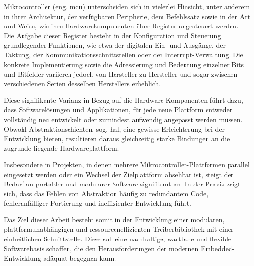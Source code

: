 Mikrocontroller (eng. \gls{mcu}) unterscheiden sich in vielerlei Hinsicht, unter anderem in ihrer Architektur, der verfügbaren Peripherie, dem Befehlssatz sowie in der Art und Weise, wie ihre Hardwarekomponenten über Register angesteuert werden.
Die Aufgabe dieser Register besteht in der Konfiguration und Steuerung grundlegender Funktionen, wie etwa der digitalen Ein- und Ausgänge, der Taktung, der Kommunikationsschnittstellen oder der Interrupt-Verwaltung.
Die konkrete Implementierung sowie die Adressierung und Bedeutung einzelner Bits und Bitfelder variieren jedoch von Hersteller zu Hersteller und sogar zwischen verschiedenen Serien desselben Herstellers erheblich.

Diese signifikante Varianz in Bezug auf die Hardware-Komponenten führt dazu, dass Softwarelösungen und Applikationen, für jede neue Plattform entweder vollständig neu entwickelt oder zumindest aufwendig angepasst werden müssen.
Obwohl Abstraktionschichten, sog. \gls{hal}, eine gewisse Erleichterung bei der Entwicklung bieten, resultieren daraus gleichzeitig starke Bindungen an die zugrunde liegende Hardwareplattform.

Insbesondere in Projekten, in denen mehrere Mikrocontroller-Plattformen parallel eingesetzt werden oder ein Wechsel der Zielplattform absehbar ist, steigt der Bedarf an portabler und modularer Software signifikant an. 
In der Praxis zeigt sich, dass das Fehlen von Abstraktion häufig zu redundantem Code, fehleranfälliger Portierung und ineffizienter Entwicklung führt.

Das Ziel dieser Arbeit besteht somit in der Entwicklung einer modularen, plattformunabhängigen und ressourceneffizienten Treiberbibliothek mit einer einheitlichen Schnittstelle. 
Diese soll eine nachhaltige, wartbare und flexible Softwarebasis schaffen, die den Herausforderungen der modernen Embedded-Entwicklung adäquat begegnen kann.

